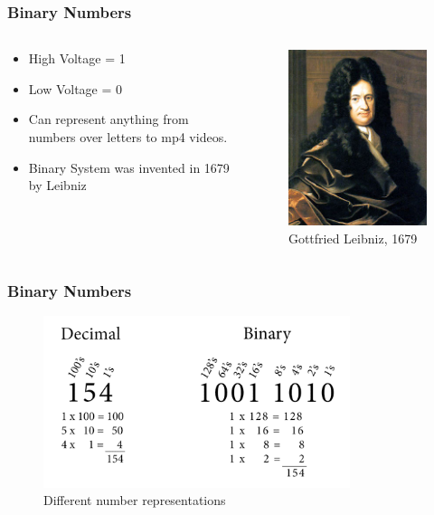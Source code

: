 \documentclass{beamer}
\begin{document}
\begin{frame}\frametitle{Binary Numbers}
  \begin{columns}
  \begin{column}{6cm}
  \begin{itemize}
   \item High Voltage = 1
   \item Low Voltage = 0
   \item Can represent anything from numbers over letters to mp4 videos.
   \item Binary System was invented in 1679 by Leibniz
  \end{itemize}

  \end{column}
  \begin{column}{6cm}
  \begin{figure}
  \includegraphics[height=0.6\textheight]{leibniz}
  \caption{Gottfried Leibniz, 1679}
  \end{figure}
  \end{column}
  \end{columns}
\end{frame}


\begin{frame}\frametitle{Binary Numbers}
  \begin{figure}
  \includegraphics[width=0.8\textwidth]{dec_vs_bin}
  \caption{Different number representations}
  \end{figure}
\end{frame}
\end{document}
